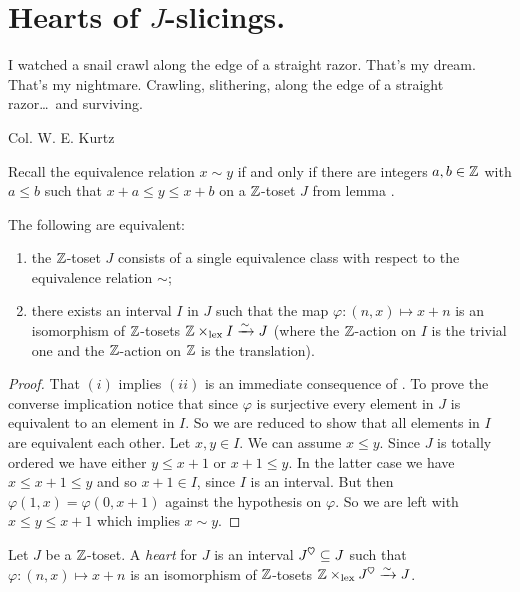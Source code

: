 \section{Hearts of $J$-slicings.}\label{hearts}
\begin{modifyepigraph}{.9}
\epigraph{I watched a snail crawl along the edge of a straight razor. That's my dream. That's my nightmare. Crawling, slithering, along the edge of a straight razor\dots\ and surviving.
}{Col. W\@. E\@. Kurtz}
\end{modifyepigraph}

Recall the equivalence relation $x\sim y$ if and only if there are integers $a,b \in \mathbb{Z}$ with $a\leq b$ such that $x + a \le y \le x + b$ on a $\mathbb{Z}$-toset $J$ from lemma .
\begin{lemma}\label{heartability}
The following are equivalent:
\begin{enumerate}[label=$\roman*$)]
\item the  $\mathbb{Z}$-toset $J$ consists of a single equivalence class with respect to the equivalence relation $\sim$; 
\item there exists an interval $I$ in $J$ such that the map $\varphi\colon (n,x)\mapsto x+n$ is an isomorphism of $\mathbb{Z}$-tosets $\mathbb{Z}\times_{\mathrm{lex}}I\xrightarrow{\sim} J$ (where the $\mathbb{Z}$-action on $I$ is the trivial one and the $\mathbb{Z}$-action on $\mathbb{Z}$ is the translation).
\end{enumerate}
\end{lemma}
\begin{proof}
That $(i)$ implies $(ii)$ is an immediate consequence of . To prove the converse implication notice that since $\varphi$ is surjective every element in $J$ is equivalent to an element in $I$. So we are reduced to show that all elements in $I$ are equivalent each other. Let $x,y\in I$. We can assume $x\leq y$. Since $J$ is totally ordered we have either $y\leq x+1$ or $x+1\leq y$. In the latter case we have $x\leq x+1\leq y$ and so $x+1\in I$, since $I$ is an interval. But then $\varphi(1,x)=\varphi(0,x+1)$ against the hypothesis on $\varphi$. So we are left with $x\leq y\leq x+1$ which implies $x\sim y$.  
\end{proof}
\begin{definition}
Let $J$ be a $\mathbb{Z}$-toset. A \emph{heart} for $J$ is an interval $J^\heart\subseteq J$ such that $\varphi\colon (n,x)\mapsto x+n$ is an isomorphism of $\mathbb{Z}$-tosets $\Z\times_{\mathrm{lex}}J^\heart \xto{\sim} J$.
\end{definition}
